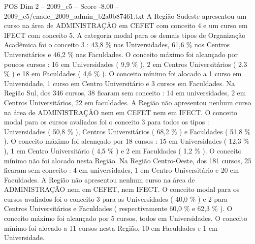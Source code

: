 \begin{textsample}{POS Dim 2 – 2009\_c5 – Score -8.00 – 2009\_c5/enade\_2009\_admin\_b2a0b87461.txt}
A Região Sudeste apresentou um curso na área de ADMINISTRAÇÃO em CEFET com conceito 4 e um curso em IFECT com conceito 5.
A categoria modal para os demais tipos de Organização Acadêmica foi o conceito 3 : 43,8 \% nas Universidades, 61,6 \% nos Centros Universitários e 46,2 \% nas Faculdades.
O conceito máximo foi alcançado por poucos cursos : 16 em Universidades ( 9,9 \% ), 2 em Centros Universitários ( 2,3 \% ) e 18 em Faculdades ( 4,6 \% ).
O conceito mínimo foi alocado a 1 curso em Universidade, 1 curso em Centro Universitário e 3 cursos em Faculdades.
Na Região Sul, dos 346 cursos, 38 ficaram sem conceito : 14 em universidades, 2 em Centros Universitários, 22 em faculdades.
A Região não apresentou nenhum curso na área de ADMINISTRAÇÃO nem em CEFET nem em IFECT.
O conceito modal para os cursos avaliados foi o conceito 3 para todos os tipos : Universidades ( 50,8 \% ), Centros Universitários ( 68,2 \% ) e Faculdades ( 51,8 \% ).
O conceito máximo foi alcançado por 18 cursos : 15 em Universidades ( 12,3 \% ), 1 em Centro Universitário ( 4,5 \% ) e 2 em Faculdades ( 1,2 \% ).
O conceito mínimo não foi alocado nesta Região.
Na Região Centro-Oeste, dos 181 cursos, 25 ficaram sem conceito : 4 em universidades, 1 em Centro Universitário e 20 em Faculdades.
A Região não apresentou nenhum curso na área de ADMINISTRAÇÃO nem em CEFET, nem IFECT.
O conceito modal para os cursos avaliados foi o conceito 3 para as Universidades ( 40,0 \% ) e 2 para Centros Universitários e Faculdades ( respectivamente 60,0 \% e 62,3 \% ).
O conceito máximo foi alcançado por 5 cursos, todos em Universidades.
O conceito mínimo foi alocado a 11 cursos nesta Região, 10 em Faculdades e 1 em Universidade.

\end{textsample}
